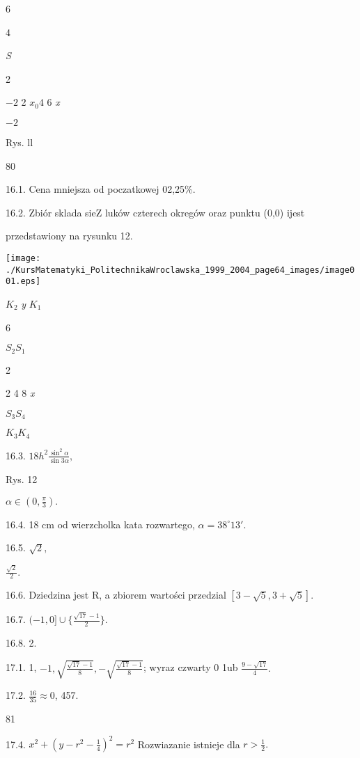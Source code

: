 \documentclass[a4paper,12pt]{article}
\begin{document}
6

4

{\it S}

2

$-2$  2 $x_{0}4$ 6  {\it x}

$-2$

Rys. ll





80

16.1. Cena mniejsza od poczatkowej 02,25\%.

16.2. Zbiór sklada sieZ luków czterech okregów oraz punktu (0,0) ijest

przedstawiony na rysunku 12.
\begin{center}
\texttt{[image: ./KursMatematyki\_PolitechnikaWroclawska\_1999\_2004\_page64\_images/image001.eps]}
\end{center}
$K_{2}$  {\it y}  $K_{1}$

6

$S_{2}  S_{1}$

2

2 4  8  {\it x}

$S_{3}  S_{4}$

$K_{3}  K_{4}$

16.3. $18h^{2}\displaystyle \frac{\sin^{2}\alpha}{\sin 3\alpha},$

Rys. 12

$\alpha\in (0,\displaystyle \frac{\pi}{3}).$

16.4. 18 cm od wierzcholka kata rozwartego, $\alpha=38^{\circ}13'.$

16.5. $\sqrt{2},$

$\displaystyle \frac{\sqrt{2}}{2}.$

16.6. Dziedzina jest $\mathrm{R}$, a zbiorem wartości przedzial $[3-\sqrt{5},3+\sqrt{5}].$

16.7. $(-1,0]\displaystyle \cup\{\frac{\sqrt{17}-1}{2}\}.$

16.8. 2.

17.1. 1, $-1, \sqrt{\frac{\sqrt{17}-1}{8}}, -\sqrt{\frac{\sqrt{17}-1}{8}}$; wyraz czwarty 0 1ub $\displaystyle \frac{9-\sqrt{17}}{4}.$

17.2. $\displaystyle \frac{16}{35}\approx 0$, 457.





81

17.4. $x^{2}+(y-r^{2}-\displaystyle \frac{1}{4})^{2}=r^{2}$ Rozwiazanie istnieje dla $r>\displaystyle \frac{1}{2}.$
\end{document}
